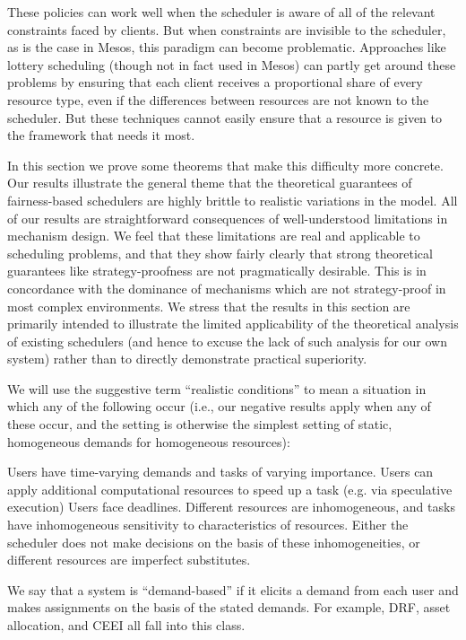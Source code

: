 \documentclass{acm_proc_article-sp}
\begin{document}
These policies can work well when the scheduler is aware of all of the relevant constraints faced by clients. But when constraints are invisible to the scheduler, as is the case in Mesos, this paradigm can become problematic. Approaches like lottery scheduling (though not in fact used in Mesos) can partly get around these problems by ensuring that each client receives a proportional share of every resource type, even if the differences between resources are not known to the scheduler. But these techniques cannot easily ensure that a resource is given to the framework that needs it most.

In this section we prove some theorems that make this difficulty more concrete. Our results illustrate the general theme that the theoretical guarantees of fairness-based schedulers are highly brittle to realistic variations in the model. All of our results are straightforward consequences of well-understood limitations in mechanism design. We feel that these limitations are real and applicable to scheduling problems, and that they show fairly clearly that strong theoretical guarantees like strategy-proofness are not pragmatically desirable. This is in concordance with the dominance of mechanisms which are not strategy-proof in most complex environments. We stress that the results in this section are primarily intended to illustrate the limited applicability of the theoretical analysis of existing schedulers (and hence to excuse the lack of such analysis for our own system) rather than to directly demonstrate practical superiority.

We will use the suggestive term ``realistic conditions'' to mean a situation in which any of the following occur (i.e., our negative results apply when any of these occur, and the setting is otherwise the simplest setting of static, homogeneous demands for homogeneous resources):

Users have time-varying demands and tasks of varying importance.
Users can apply additional computational resources to speed up a task (e.g. via speculative execution)
Users face deadlines.
Different resources are inhomogeneous, and tasks have inhomogeneous sensitivity to characteristics of resources. Either the scheduler does not make decisions on the basis of these inhomogeneities, or different resources are imperfect substitutes.

We say that a system is ``demand-based'' if it elicits a demand from each user and makes assignments on the basis of the stated demands. For example, DRF, asset allocation, and CEEI all fall into this class.
\end{document}
